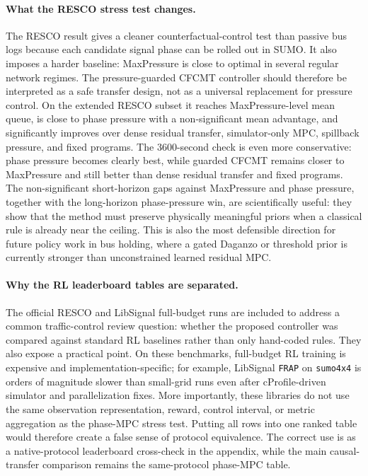 \paragraph{What the RESCO stress test changes.}
The RESCO result gives a cleaner counterfactual-control test than passive bus logs because each candidate signal phase can be rolled out in SUMO.
It also imposes a harder baseline: MaxPressure is close to optimal in several regular network regimes.
The pressure-guarded CFCMT controller should therefore be interpreted as a safe transfer design, not as a universal replacement for pressure control.
On the extended RESCO subset it reaches MaxPressure-level mean queue, is close to phase pressure with a non-significant mean advantage, and significantly improves over dense residual transfer, simulator-only MPC, spillback pressure, and fixed programs.
The 3600-second check is even more conservative: phase pressure becomes clearly best, while guarded CFCMT remains closer to MaxPressure and still better than dense residual transfer and fixed programs.
The non-significant short-horizon gaps against MaxPressure and phase pressure, together with the long-horizon phase-pressure win, are scientifically useful: they show that the method must preserve physically meaningful priors when a classical rule is already near the ceiling.
This is also the most defensible direction for future policy work in bus holding, where a gated Daganzo or threshold prior is currently stronger than unconstrained learned residual MPC.

\paragraph{Why the RL leaderboard tables are separated.}
The official RESCO and LibSignal full-budget runs are included to address a common traffic-control review question: whether the proposed controller was compared against standard RL baselines rather than only hand-coded rules.
They also expose a practical point.
On these benchmarks, full-budget RL training is expensive and implementation-specific; for example, LibSignal \texttt{FRAP} on \texttt{sumo4x4} is orders of magnitude slower than small-grid runs even after cProfile-driven simulator and parallelization fixes.
More importantly, these libraries do not use the same observation representation, reward, control interval, or metric aggregation as the \ours phase-MPC stress test.
Putting all rows into one ranked table would therefore create a false sense of protocol equivalence.
The correct use is as a native-protocol leaderboard cross-check in the appendix, while the main causal-transfer comparison remains the same-protocol phase-MPC table.

